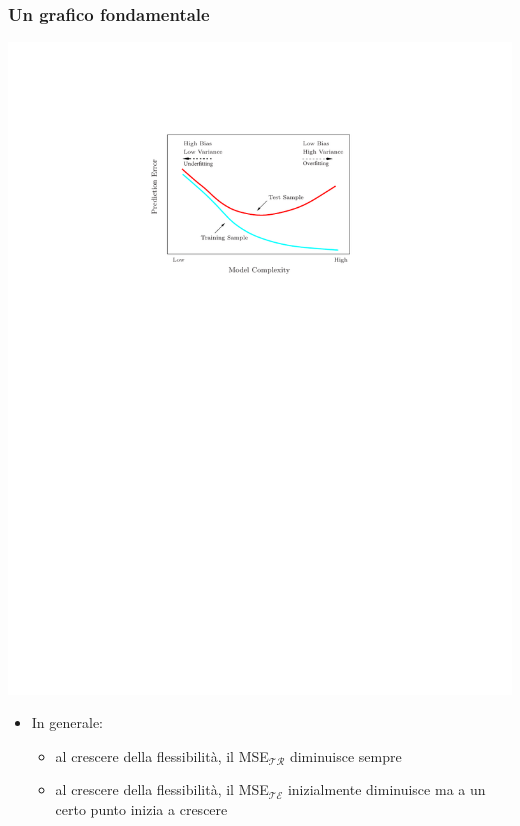 \begin{frame}

	\frametitle{Un grafico fondamentale}

	\begin{center}
		\includegraphics[scale=0.8]{images/supervised/knn_regression/MSE.pdf}
	\end{center}

	\begin{itemize}
		\item In generale:
			\begin{itemize}
				\item al crescere della flessibilità, il MSE$_{\mathcal{TR}}$ diminuisce sempre
				\item al crescere della flessibilità, il MSE$_{\mathcal{TE}}$ inizialmente diminuisce ma a un certo punto inizia a crescere
			\end{itemize}
	\end{itemize}
\end{frame}



